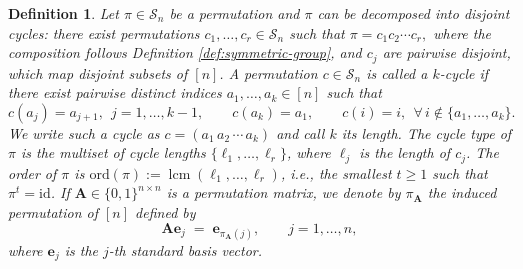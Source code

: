 \documentclass[onecolumn]{IEEEtran} %
\newcommand{\bA}{\mathbf A}
\newcommand{\1}{\mathbbm{1}}
\theoremstyle{boldremark}
\newtheorem{definition}{Definition}
\newcommand{\be}{\mathbf e}
\begin{document}

\begin{definition}\label{def:cycle-decomp-type}
Let $\pi\in\mathcal{S}_n$ be a permutation and $\pi$ can be decomposed into \emph{disjoint cycles}:
there exist permutations $c_1,\dots,c_r\in\mathcal{S}_n$ such that
$\pi = c_1 c_2 \cdots c_r,$ where the composition follows Definition \ref{def:symmetric-group}, and $c_j$ are pairwise disjoint, which map disjoint subsets of $[n]$.
A permutation $c\in\mathcal{S}_n$ is called a
\emph{$k$-cycle} if there exist pairwise distinct indices $a_1,\dots,a_k\in[n]$
such that
\[
  c(a_j)=a_{j+1},\ \ j=1,\dots,k-1,\qquad
  c(a_k)=a_1,\qquad
  c(i)=i,\ \ \forall\, i\notin\{a_1,\dots,a_k\}.
\]
We write such a cycle as $c=(a_1\,a_2\,\cdots\,a_k)$ and call $k$ its \emph{length}. The \emph{cycle type} of $\pi$ is the multiset of cycle lengths $\{\ell_1,\dots,\ell_r\}$, where $\ell_j$ is the length of $c_j$.
The \emph{order} of $\pi$ is $\mathrm{ord}(\pi):=\operatorname{lcm}(\ell_1,\dots,\ell_r)$, i.e., the smallest $t\ge 1$ such that $\pi^t=\mathrm{id}$.
If $\bA\in\{0,1\}^{n\times n}$ is a permutation matrix, we denote by $\pi_{\bA}$
the induced permutation of $[n]$ defined by
\[
  \bA \be_j \;=\; \be_{\pi_{\bA}(j)},\qquad j=1,\dots,n,
\]
where $\be_j$ is the $j$-th standard basis vector.
\end{definition}
\end{document}
